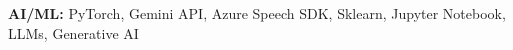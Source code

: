             \textbf{AI/ML: }{PyTorch, Gemini API, Azure Speech SDK, Sklearn, Jupyter Notebook, LLMs, Generative AI}
